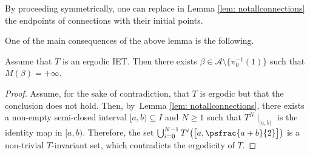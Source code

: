 \begin{remark}
By proceeding symmetrically, one can replace in Lemma \ref{lem: notallconnections} the endpoints of connections with their initial points.
\end{remark}

One of the main consequences of the above lemma is the following.

\skpt
\begin{corollary}\label{cor: existenceofinfiniteorbit}
Assume that $T$ is an ergodic IET. Then there exists {$\beta \in\mathcal A \setminus \{\pi_0^{-1}(1)\}$ such that $M(\beta) = +\infty$. }
\end{corollary}

\begin{proof}
Assume, for the sake of contradiction, that $T$ is ergodic but that the conclusion does not hold. Then, by~Lemma \ref{lem: notallconnections}, there exists a non-empty semi-closed interval $[a, b) \subseteq I$ and $N \geq 1$ such that $T^N\mid_{[a, b)}$ is the identity map in $[a, b)$. Therefore, the set $\bigcup_{i = 0}^{N - 1} T^i\big( \big[a, \psfrac{a + b}{2}\big]\big)$ is a non-trivial $T$-invariant set, which contradicts the ergodicity of $T$.
\end{proof}

